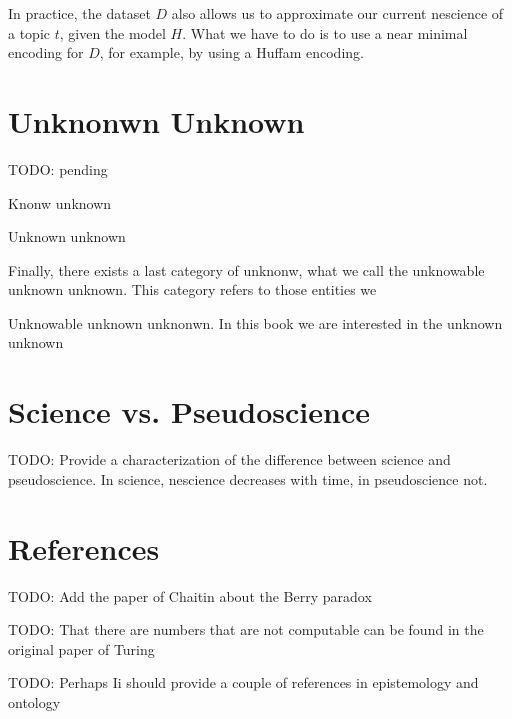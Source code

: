 In practice, the dataset $D$ also allows us to approximate our current
nescience of a topic $t$, given the model $H$. What we have to do
is to use a near minimal encoding for $D$, for example, by using
a Huffam encoding.


%
%

\section{Unknonwn Unknown}

{\color{red} TODO: pending}

Knonw unknown

Unknown unknown

Finally, there exists a last category of unknonw, what we call the unknowable unknown unknown. This category refers to those entities we

Unknowable unknown unknonwn. In this book we are interested in the unknown unknown

%
%

\section{Science vs. Pseudoscience}

{\color{red} TODO: Provide a characterization of the difference between science and pseudoscience. In science, nescience decreases with time, in pseudoscience not.}

%
%

\section*{References}

{\color{red} TODO: Add the paper of Chaitin about the Berry paradox}

{\color{red} TODO: That there are numbers that are not computable can be found in the original paper of Turing}

{\color{red} TODO: Perhaps Ii should provide a couple of references in epistemology and ontology}
